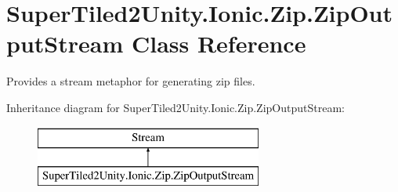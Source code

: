 \hypertarget{class_super_tiled2_unity_1_1_ionic_1_1_zip_1_1_zip_output_stream}{}\section{Super\+Tiled2\+Unity.\+Ionic.\+Zip.\+Zip\+Output\+Stream Class Reference}
\label{class_super_tiled2_unity_1_1_ionic_1_1_zip_1_1_zip_output_stream}


Provides a stream metaphor for generating zip files.  


Inheritance diagram for Super\+Tiled2\+Unity.\+Ionic.\+Zip.\+Zip\+Output\+Stream\+:\begin{figure}[H]
\begin{center}
\leavevmode
\includegraphics[height=2.000000cm]{class_super_tiled2_unity_1_1_ionic_1_1_zip_1_1_zip_output_stream}
\end{center}
\end{figure}
